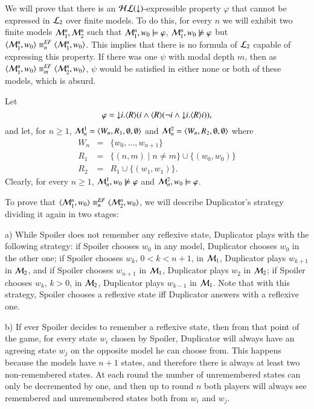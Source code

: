 \begin{pf}
We will prove that there is an $\mathcal{HL}({\downarrow})$-expressible property
$\varphi$ that cannot be expressed in $\mathcal{L}_2$ over finite models.
To do this, for every $n$ we will exhibit two finite models
$\mathcal{M}_1^n,\mathcal{M}_2^n$ such that $\mathcal{M}_1^n,w_0\models\varphi$,
$\mathcal{M}_1^n,w_0\not\models\varphi$ but
$\langle \mathcal{M}_1^n,w_0 \rangle\equiv^{\mathit{EF}}_n\langle \mathcal{M}_1^n,w_0 \rangle$. This implies
that there is no formula of $\mathcal{L}_2$ capable of expressing this
property. If there was one $\psi$ with modal depth $m$, then as
$\langle \mathcal{M}_1^n,w_0 \rangle\equiv^{\mathit{EF}}_m\langle \mathcal{M}_2^n,w_0 \rangle$,  $\psi$ would be
satisfied in either none or both of these models, which is absurd.

Let
\[
 \varphi =
{\downarrow} i. \langle R \rangle(i \land \langle R \rangle(\lnot i \land {\downarrow} i.
\langle R \rangle i)),
\]
and let, for $n\geq 1$, $\mathcal{M}^1_n = \langle W_n, R_1, \emptyset,
\emptyset \rangle$ and $\mathcal{M}^2_n = \langle W_n, R_2, \emptyset, \emptyset \rangle$
where
\begin{eqnarray*}
W_n&=&\{w_0, \dots, w_{n+1}\}\\
R_1&=&\{(n,m)\mid n \neq m\} \cup \{(w_0,w_0)\}\\
R_2&=&R_1 \cup \{(w_1, w_1)\}.
\end{eqnarray*}
%
Clearly, for every $n \geq 1$, $\mathcal{M}^1_n, w_0 \not\models \varphi$ and
$\mathcal{M}^2_n, w_0 \models \varphi$.

To prove that $\langle \mathcal{M}_1^n,w_0 \rangle\equiv^{\mathit{EF}}_n\langle \mathcal{M}_2^n,w_0 \rangle$, we
will describe Duplicator's strategy dividing it again in two stages:
\smallskip

\noindent
a) While Spoiler does not remember any reflexive state,
Duplicator plays with the following strategy: if Spoiler chooses
$w_0$ in any model, Duplicator chooses $w_0$ in the other one; if
Spoiler chooses $w_k$, $0 < k < n+1$, in $\mathcal{M}_1$, Duplicator
plays $w_{k+1}$ in $\mathcal{M}_2$, and if Spoiler chooses $w_{n+1}$ in
$\mathcal{M}_1$, Duplicator plays $w_2$ in $\mathcal{M}_2$; if Spoiler chooses
$w_k$, $k > 0$, in $\mathcal{M}_2$, Duplicator plays $w_{k-1}$ in
$\mathcal{M}_1$. Note that with this strategy, Spoiler chooses a
reflexive state iff Duplicator answers with a reflexive one.

\noindent b) If ever Spoiler decides to remember a reflexive state,
then from that point of the game, for every state $w_i$ chosen by
Spoiler, Duplicator will always have an agreeing state $w_j$ on the
opposite model he can choose from. This happens because the models
have $n+1$ states, and therefore there is always at least two
non-remembered states. At each round the number of unremembered
states can only be decremented by one, and then up to round $n$ both
players will always see remembered and unremembered states both from
$w_i$ and $w_j$.
\end{pf}

